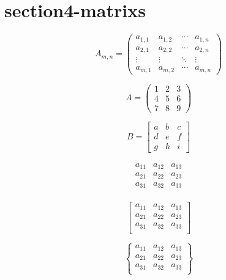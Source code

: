 \documentclass{article}
\begin{document}
\section{section4-matrixs}
\begin{equation}
A_{m,n} = 
\begin{pmatrix}
a_{1,1} & a_{1,2} & \cdots & a_{1,n} \\
a_{2,1} & a_{2,2} & \cdots & a_{2,n} \\
\vdots  & \vdots  & \ddots & \vdots  \\
a_{m,1} & a_{m,2} & \cdots & a_{m,n} 
\end{pmatrix}
\end{equation}

\begin{equation}
A = 
\begin{pmatrix}
1 & 2 & 3 \\
4 & 5 & 6 \\
7 & 8 & 9
\end{pmatrix}
\end{equation}

\begin{equation*}
B = 
\begin{bmatrix}
a & b & c \\
d & e & f \\
g & h & i
\end{bmatrix}
\end{equation*}

\begin{equation}
   \begin{matrix} 
   a_{11} & a_{12} & a_{13}  \\
   a_{21} & a_{22} & a_{23}  \\
   a_{31} & a_{32} & a_{33}  \\
   \end{matrix} 
\end{equation}

\begin{equation}
  \left[
   \begin{matrix} 
   a_{11} & a_{12} & a_{13}  \\
   a_{21} & a_{22} & a_{23}  \\
   a_{31} & a_{32} & a_{33}  \\
   \end{matrix} 
  \right]
\end{equation}

\begin{equation}
  \left\{
   \begin{matrix} 
   a_{11} & a_{12} & a_{13}  \\
   a_{21} & a_{22} & a_{23}  \\
   a_{31} & a_{32} & a_{33}  \\
   \end{matrix} 
  \right\}
\end{equation}
\end{document}
